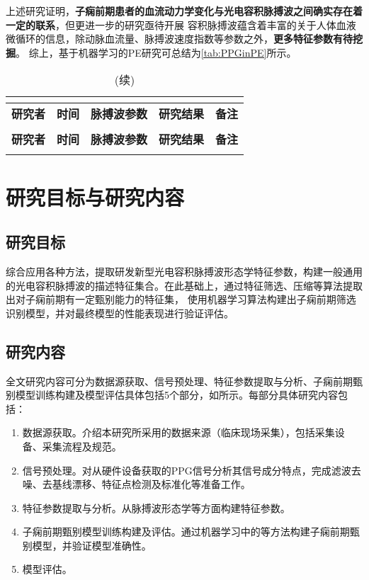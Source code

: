 上述研究证明，\textbf{子痫前期患者的血流动力学变化与光电容积脉搏波之间确实存在着一定的联系}，但更进一步的研究亟待开展
容积脉搏波蕴含着丰富的关于人体血液微循环的信息，除动脉血流量、脉搏波速度指数等参数之外，\textbf{更多特征参数有待挖掘}。
综上，基于机器学习的PE研究可总结为\autoref{tab:PPGinPE}所示。

\begin{center}
    \fontsize{10}{4}
	\begin{longtable}{m{3cm}<{\centering}m{1cm}<{\centering}m{2cm}<{\centering}m{6cm}<{\centering}m{1cm}<{\centering}}
		\caption{基于脉搏波的PE研究小结}\\
		\label{tab:PPGinPE}\\
		\hline
            \textbf{研究者}&\textbf{时间}&\textbf{脉搏波参数}&\textbf{研究结果}&\textbf{备注}\\
        \hline
        \endfirsthead
        \caption[]{(续)}\\
        \hline
            \textbf{研究者}&\textbf{时间}&\textbf{脉搏波参数}&\textbf{研究结果}&\textbf{备注}\\
        \hline
        \endhead 
        \hline
        \endfoot
	\end{longtable}
\end{center}

\section{研究目标与研究内容}

\subsection{研究目标}
综合应用各种方法，提取研发新型光电容积脉搏波形态学特征参数，构建一般通用的光电容积脉搏波的描述特征集合。在此基础上，通过特征筛选、压缩等算法提取出对子痫前期有一定甄别能力的特征集，
使用机器学习算法构建出子痫前期筛选识别模型，并对最终模型的性能表现进行验证评估。
\subsection{研究内容}
全文研究内容可分为数据源获取、信号预处理、特征参数提取与分析、子痫前期甄别模型训练构建及模型评估具体包括5个部分，如所示。每部分具体研究内容包括：
\begin{enumerate}
    \item 数据源获取。介绍本研究所采用的数据来源（临床现场采集），包括采集设备、采集流程及规范。  
    \item 信号预处理。对从硬件设备获取的PPG信号分析其信号成分特点，完成滤波去噪、去基线漂移、特征点检测及标准化等准备工作。
    \item 特征参数提取与分析。从脉搏波形态学等方面构建特征参数。
    \item 子痫前期甄别模型训练构建及评估。通过机器学习中的等方法构建子痫前期甄别模型，并验证模型准确性。
    \item 模型评估。
\end{enumerate}

